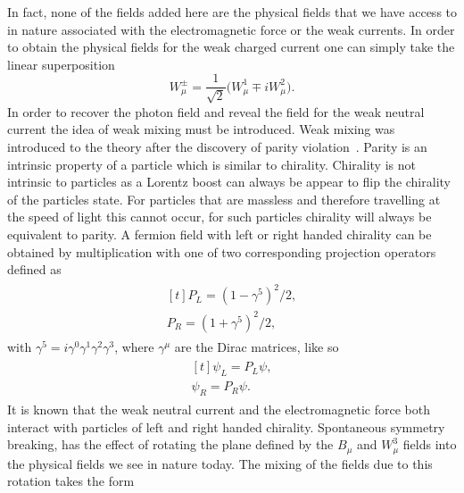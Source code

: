 In fact, none of the fields added here are the physical fields that we have
access to in nature associated with the electromagnetic force or the weak
currents. In order to obtain the physical fields for the weak charged current
one can simply take the linear superposition
\begin{equation}
  \label{eq:weak-charged-current} W_\mu^\pm = \frac{1}{\sqrt{2}}\big(W_\mu^{1}
\mp iW_\mu^2\big).
\end{equation} In order to recover the photon field and reveal the field for the
weak neutral current the idea of weak mixing must be introduced. Weak mixing was
introduced to the theory after the discovery of parity
violation~\cite{wu-parity}. Parity is an intrinsic property of a particle which
is similar to chirality. Chirality is not intrinsic to particles as a Lorentz
boost can always be appear to flip the chirality of the particles state. For
particles that are massless and therefore travelling at the speed of light this
cannot occur, for such particles chirality will always be equivalent to parity.
A fermion field with left or right handed chirality can be obtained by
multiplication with one of two corresponding projection operators defined as
\begin{equation}
  \begin{split}
    \begin{aligned}[t] P_L = {(1 - \gamma^{5})}^{2} / 2, \\ P_R = {(1 +
\gamma^{5})}^{2} / 2,
    \end{aligned}
  \end{split}
\end{equation} with $\gamma^{5} = i\gamma^{0}\gamma^{1}\gamma^{2}\gamma^{3}$,
where $\gamma^{\mu}$ are the Dirac matrices, like so
\begin{equation}
  \label{eq:chiral-fermions}
  \begin{split}
    \begin{aligned}[t] \psi_{L} = P_{L}\psi,\\ \psi_{R} = P_{R}\psi.
    \end{aligned}
  \end{split}
\end{equation} It is known that the weak neutral current and the electromagnetic
force both interact with particles of left and right handed chirality.
Spontaneous symmetry breaking, has the effect of rotating the plane defined by
the $B_\mu$ and $W_\mu^3$ fields into the physical fields we see in nature
today. The mixing of the fields due to this rotation takes the form
